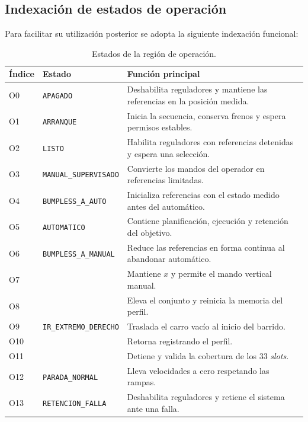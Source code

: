 \documentclass[a4paper,10pt,onecolumn,journal]{ieeeconf}
\numberwithin{equation}{section}
\begin{document}
\subsection{Indexación de estados de operación}
Para facilitar su utilización posterior se adopta la siguiente indexación funcional:
\begin{longtable}{C{1.2cm} L{4.4cm} L{8.2cm}}
\caption{Estados de la región de operación.}\\
\toprule
Índice & Estado & Función principal\\
\midrule
O0 & \texttt{APAGADO} & Deshabilita reguladores y mantiene las referencias en la posición medida.\\
O1 & \texttt{ARRANQUE} & Inicia la secuencia, conserva frenos y espera permisos estables.\\
O2 & \texttt{LISTO} & Habilita reguladores con referencias detenidas y espera una selección.\\
O3 & \texttt{MANUAL\_SUPERVISADO} & Convierte los mandos del operador en referencias limitadas.\\
O4 & \texttt{BUMPLESS\_A\_AUTO} & Inicializa referencias con el estado medido antes del automático.\\
O5 & \texttt{AUTOMATICO} & Contiene planificación, ejecución y retención del objetivo.\\
O6 & \texttt{BUMPLESS\_A\_MANUAL} & Reduce las referencias en forma continua al abandonar automático.\\
O7 &  & Mantiene $x$ y permite el mando vertical manual.\\
O8 &  & Eleva el conjunto y reinicia la memoria del perfil.\\
O9 & \texttt{IR\_EXTREMO\_DERECHO} & Traslada el carro vacío al inicio del barrido.\\
O10 &  & Retorna registrando el perfil.\\
O11 &  & Detiene y valida la cobertura de los 33 \textit{slots}.\\
O12 & \texttt{PARADA\_NORMAL} & Lleva velocidades a cero respetando las rampas.\\
O13 & \texttt{RETENCION\_FALLA} & Deshabilita reguladores y retiene el sistema ante una falla.\\
\bottomrule
\end{longtable}


\Needspace{.55\textheight}
\end{document}
